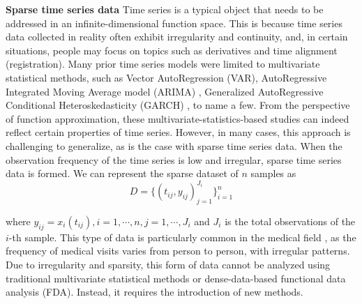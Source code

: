 \documentclass{article}
\begin{document}
\textbf{Sparse time series data}
Time series is a typical object that needs to be addressed in an infinite-dimensional function space. 
This is because time series data collected in reality often exhibit irregularity and continuity, and, in certain situations, people may focus on topics such as derivatives and time alignment (registration).
Many prior time series models were limited to multivariate statistical methods, such as Vector AutoRegression (VAR)\cite{stock2001vector}, AutoRegressive Integrated Moving Average model (ARIMA) \cite{box2015time}, Generalized AutoRegressive Conditional Heteroskedasticity (GARCH) \cite{francq2019garch}, to name a few.
From the perspective of function approximation, these multivariate-statistics-based studies can indeed reflect certain properties of time series. 
However, in many cases, this approach is challenging to generalize, as is the case with sparse time series data.
When the observation frequency of the time series is low and irregular, sparse time series data is formed. 
We can represent the sparse dataset of $n$ samples as 
$$
D=\{(t_{ij},y_{ij})_{j=1}^{J_i}\}_{i=1}^n
$$

where
$y_{ij}=x_i(t_{ij}) , i=1, \cdots, n, j=1, \cdots, J_i$ and $J_i$ is the total observations of the $i$-th sample.
This type of data is particularly common in the medical field \cite{holte2012efficient,muller2005functional}, as the frequency of medical visits varies from person to person, with irregular patterns.
Due to irregularity and sparsity, this form of data cannot be analyzed using traditional multivariate statistical methods or dense-data-based functional data analysis (FDA). Instead, it requires the introduction of new methods.
\end{document}
